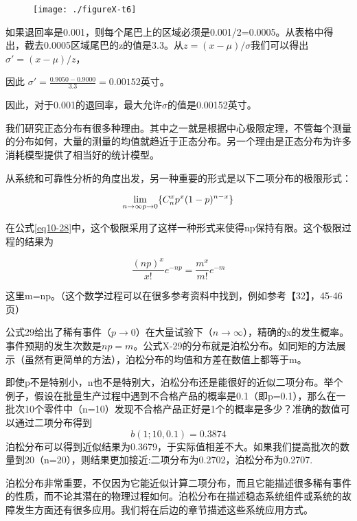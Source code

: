 \documentclass[cn,11pt,chinese]{elegantbook}
\begin{document}
{\begin{figure}
	\texttt{[image: ./figureX-t6]}
\end{figure}


如果退回率是0.001，则每个尾巴上的区域必须是0.001/2=0.0005。从表格中得出，截去0.0005区域尾巴的z的值是3.3。从$z=(x-\mu)/\sigma$我们可以得出$\sigma '=(x-\mu)/z$，

因此 $\sigma '=\frac{0.9050-0.9000}{3.3}=0.00152\mbox{英寸}$。

因此，对于0.001的退回率，最大允许$\sigma$的值是0.00152英寸。

我们研究正态分布有很多种理由。其中之一就是根据中心极限定理，不管每个测量的分布如何，大量的测量的均值就趋近于正态分布。另一个理由是正态分布为许多消耗模型提供了相当好的统计模型。

从系统和可靠性分析的角度出发，另一种重要的形式是以下二项分布的极限形式：

\begin{equation}\label{eq10-28}
\lim_{n\to \infty \\ p\to 0}\{C_n^xp^x(1-p)^{n-x}\} 
\end{equation}


在公式\ref{eq10-28}中，这个极限采用了这样一种形式来使得np保持有限。这个极限过程的结果为

\begin{equation}\label{eq10-29}
\frac{(np)^x}{x!}e^{-np}=\frac{m^x}{m!}e^{-m}
\end{equation}



这里m=np。（这个数学过程可以在很多参考资料中找到，例如参考【32】，45-46页）

公式29给出了稀有事件（$p\to 0$）在大量试验下（$n \to \infty$），精确的x的发生概率。事件预期的发生次数是$np=m$。公式X-29的分布就是泊松分布。如同矩的方法展示（虽然有更简单的方法），泊松分布的均值和方差在数值上都等于m。

即使p不是特别小，n也不是特别大，泊松分布还是能很好的近似二项分布。举个例子，假设在批量生产过程中遇到不合格产品的概率是0.1（即p=0.1），那么在一批次10个零件中（n=10）发现不合格产品正好是1个的概率是多少？准确的数值可以通过二项分布得到
$$b(1;10,0.1)=0.3874$$
泊松分布可以得到近似结果为0.3679，于实际值相差不大。如果我们提高批次的数量到20（n=20），则结果更加接近:二项分布为0.2702，泊松分布为0.2707.

泊松分布非常重要，不仅因为它能近似计算二项分布，而且它能描述很多稀有事件的性质，而不论其潜在的物理过程如何。泊松分布在描述稳态系统组件或系统的故障发生方面还有很多应用。我们将在后边的章节描述这些系统应用方式。

}
\end{document}
